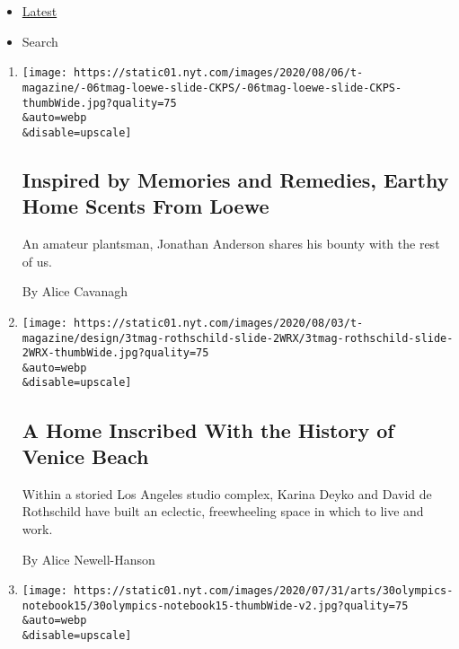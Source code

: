 \begin{itemize}
\tightlist
\item
  \protect\hyperlink{stream-panel}{Latest}
\item
  Search
\end{itemize}

\begin{enumerate}
\def\labelenumi{\arabic{enumi}.}
\item
  \href{/2020/08/06/t-magazine/loewe-home-scents-candles.html}{}

  \texttt{[image: https://static01.nyt.com/images/2020/08/06/t-magazine/-06tmag-loewe-slide-CKPS/-06tmag-loewe-slide-CKPS-thumbWide.jpg?quality=75\\\&auto=webp\\\&disable=upscale]}

  \hypertarget{inspired-by-memories-and-remedies-earthy-home-scents-from-loewe}{%
  \subsection{Inspired by Memories and Remedies, Earthy Home Scents From
  Loewe}\label{inspired-by-memories-and-remedies-earthy-home-scents-from-loewe}}

  An amateur plantsman, Jonathan Anderson shares his bounty with the
  rest of us.

  By Alice Cavanagh
\item
  \href{/2020/08/03/t-magazine/david-de-rothschild-venice-home-design.html}{}

  \texttt{[image: https://static01.nyt.com/images/2020/08/03/t-magazine/design/3tmag-rothschild-slide-2WRX/3tmag-rothschild-slide-2WRX-thumbWide.jpg?quality=75\\\&auto=webp\\\&disable=upscale]}

  \hypertarget{a-home-inscribed-with-the-history-of-venice-beach}{%
  \subsection{A Home Inscribed With the History of Venice
  Beach}\label{a-home-inscribed-with-the-history-of-venice-beach}}

  Within a storied Los Angeles studio complex, Karina Deyko and David de
  Rothschild have built an eclectic, freewheeling space in which to live
  and work.

  By Alice Newell-Hanson
\item
  \href{/2020/07/30/arts/design/tokyo-olympics-1964-design.html}{}

  \texttt{[image: https://static01.nyt.com/images/2020/07/31/arts/30olympics-notebook15/30olympics-notebook15-thumbWide-v2.jpg?quality=75\\\&auto=webp\\\&disable=upscale]}


\end{enumerate}
